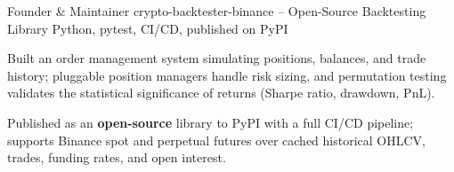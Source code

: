 

\begin{cventries}

  \cventry
    {Founder \& Maintainer} %
    {crypto-backtester-binance -- Open-Source Backtesting Library} %
    {Python, pytest, CI/CD, published on PyPI} %
    {} %
    {
      \begin{cvitems}
        \item {Built an order management system simulating positions, balances, and trade history; pluggable position managers handle risk sizing, and permutation testing validates the statistical significance of returns (Sharpe ratio, drawdown, PnL).}
        \item {Published as an \textbf{open-source} library to PyPI with a full CI/CD pipeline; supports Binance spot and perpetual futures over cached historical OHLCV, trades, funding rates, and open interest.}
      \end{cvitems}
    }

\end{cventries}
